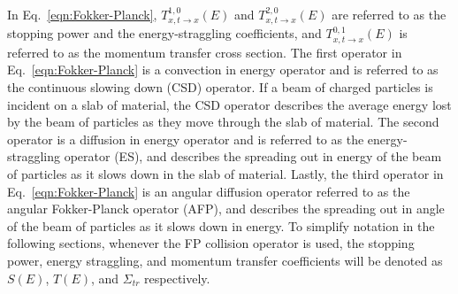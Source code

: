 In Eq.~\eqref{eqn:Fokker-Planck}, $T_{x,t \rightarrow x}^{1,0}(E)$ and $T_{x,t \rightarrow x}^{2,0}(E)$ are referred to as the stopping power and the energy-straggling coefficients, and $T_{x,t \rightarrow x}^{0,1}(E)$ is referred to as the momentum transfer cross section. The first operator in Eq.~\eqref{eqn:Fokker-Planck} is a convection in energy operator and is referred to as the continuous slowing down (CSD) operator. If a beam of charged particles is incident on a slab of material, the CSD operator describes the average energy lost by the beam of particles as they move through the slab of material. The second operator is a diffusion in energy operator and is referred to as the energy-straggling operator (ES), and describes the spreading out in energy of the beam of particles as it slows down in the slab of material. Lastly, the third operator in Eq.~\eqref{eqn:Fokker-Planck} is an angular diffusion operator referred to as the angular Fokker-Planck operator (AFP), and describes the spreading out in angle of the beam of particles as it slows down in energy. To simplify notation in the following sections, whenever the FP collision operator is used, the stopping power, energy straggling, and momentum transfer coefficients will be denoted as $S(E)$, $T(E)$, and $\Sigma_{tr}$ respectively.